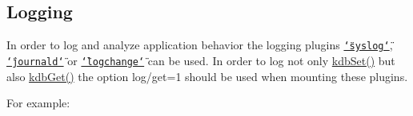 \subsection*{Logging}

In order to log and analyze application behavior the logging plugins \href{https://www.libelektra.org/plugins/syslog}{\tt \char`\"{}syslog\char`\"{}}, \href{https://www.libelektra.org/plugins/journald}{\tt \char`\"{}journald\char`\"{}} or \href{https://www.libelektra.org/plugins/logchange}{\tt \char`\"{}logchange\char`\"{}} can be used. In order to log not only {\ttfamily \hyperlink{group__kdb_ga11436b058408f83d303ca5e996832bcf}{kdb\+Set()}} but also {\ttfamily \hyperlink{group__kdb_ga28e385fd9cb7ccfe0b2f1ed2f62453a1}{kdb\+Get()}} the option {\ttfamily log/get=1} should be used when mounting these plugins.

For example\+:


 